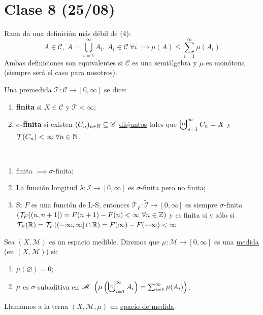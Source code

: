
\section{Clase 8 (25/08)}

\begin{remark}
	Rana da una definición más débil de (4):
	\[ A \in \mathscr{C},\ A = \bigcup_{i=1}^{\infty} A_i,\ A_i \in \mathscr{C}\ \forall i \implies \mu(A) \leq \sum_{i=1}^{\infty}\mu(A_i) \]
	\noindent Ambas definiciones son equivalentes si $\mathscr{C}$ es una semiálgebra y $\mu$ es monótona (siempre será el caso para nosotros).
\end{remark}

\begin{definition}
	Una premedida $\mathcal{T} : \mathscr{C} \to [0,\infty]$ se dice:
	\begin{enumerate}
		\item \textbf{finita} si $X \in \mathscr{C}$ y $\mathcal{T} < \infty$;

		\item \textbf{$\sigma$-finita} si existen $(C_n)_{n\in\mathbb{N}} \subseteq \mathscr{C}$ \underline{disjuntos} tales que $\bigcupd_{n=1}^{\infty} C_n = X$ y $\mathcal{T} (C_n) < \infty\ \forall n \in \mathbb{N}$.
	\end{enumerate}
\end{definition}

\begin{eg}~
	\begin{enumerate}
		\item finita $\implies \sigma$-finita;

		\item La función longitud $\lambda : \mathcal{I} \to [0,\infty]$ es $\sigma$-finita pero no finita;

		\item Si $F$ es una función de L-S, entonces $\mathcal{T}_F : \widetilde{\mathcal{I}} \to [0,\infty]$ es siempre $\sigma$-finita $(\mathcal{T}_F ((n,n+1]) = F(n+1) - F(n) < \infty\ \forall n \in \mathbb{Z})$ y es finita si y sólo si $\mathcal{T}_F (\mathbb{R}) = \mathcal{T}_F ((-\infty,\infty]\cap\mathbb{R}) = F(\infty)-F(-\infty) < \infty$.
	\end{enumerate}
\end{eg}

\begin{definition}[medida]
	Sea $(X,\mathscr{M})$ es un espacio medible. Diremos que $\mu : \mathscr{M} \to [0,\infty]$ es una \underline{medida} (en $(X,\mathscr{M})$) si:
	\begin{enumerate}
		\item $\mu (\varnothing) = 0$;
		
		\item $\mu$ es $\sigma$-subaditiva en $\mathscr{M}\ \left( \mu \left(\bigcupd_{i=1}^{\infty} A_i \right) = \sum_{i=1}^{\infty} \mu(A_i) \right)$.
	\end{enumerate}
	\noindent Llamamos a la terna $(X,\mathscr{M},\mu)$ un \underline{epacio de medida}.
\end{definition}

